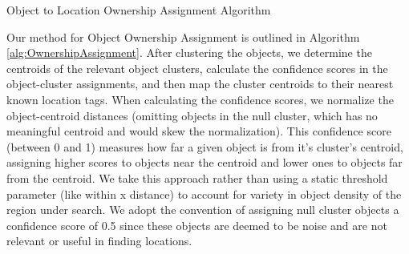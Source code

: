 \begin{algorithm}
	\caption{Object to Location Ownership Assignment Algorithm}
	\label{alg:OwnershipAssignment}
	\begin{algorithmic}
		\State{- - - - - - - - - -}
				\EndFor
			\EndFor
			\EndFor
			\EndFor 
		\EndProcedure
	\end{algorithmic}
\end{algorithm}


Our method for Object Ownership Assignment is outlined in Algorithm \ref{alg:OwnershipAssignment}. 
After clustering the objects, we determine the centroids of the relevant object clusters, calculate the confidence scores in the object-cluster assignments, and then map the cluster centroids to their nearest known location tags. 
When calculating the confidence scores, we normalize the object-centroid distances (omitting objects in the null cluster, which has no meaningful centroid and would skew the normalization). 
This confidence score (between 0 and 1) measures how far a given object is from it's cluster's centroid, assigning higher scores to objects near the centroid and lower ones to objects far from the centroid. 
We take this approach rather than using a static threshold parameter (like within x distance) to account for variety in object density of the region under search. 
We adopt the convention of assigning null cluster objects a confidence score of 0.5 since these objects are deemed to be noise and are not relevant or useful in finding locations.

